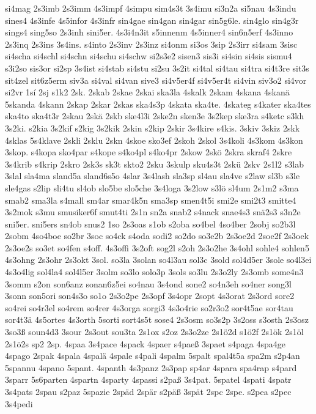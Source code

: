 {si4mag
2s3imb
2s3imm
4s3impf
4simpu
sim4s3t
3s4imu
si3n2a
si5nau
4s3indu
sines4
4s3infe
4s5infor
4s3infr
sin4gae
sin4gan
sin4gar
sin5g6le.
sin4glo
sin4g3r
sings4
sing5so
2s3inh
sini5er.
4s3i4n3it
s5innenm
4s5inner4
sin6n5erf
4s3inno
2s3inq
2s3ins
3s4ins.
s4into
2s3inv
2s3inz
si4onm
si3os
3sip
2s3irr
si4sam
3sisc
si4scha
si4schl
si4schn
si4schu
si4schw
si2s3e2
sisen3
sis3i
si4sin
si4sis
sismu4
s3i2so
sis3or
si2sp
3s4ist
si4stab
si4stu
si2su
3s2it
si4tal
si4tau
si4tra
si4t3re
sit3s
sit4zel
sit6z5erm
siv3a
si4val
si4van
sive3
si4v5er4f
si4v5er4t
si4vin
siv3o2
si4vor
si2vr
1sí
2sj
s1k2
2sk.
2skab
2skae
2skai
ska3la
4skalk
2skam
4skana
4skanä
5skanda
4skann
2skap
2skar
2skas
ska4s3p
4skata
ska4te.
4skateg
s4kater
ska4tes
ska4to
ska4t3r
2skau
2skä
2skb
ske4l3i
2ske2n
sken3e
3s2kep
ske3ra
s4ketc
s3kh
3s2ki.
s2kia
3s2kif
s2kig
3s2kik
2skin
s2kip
2skir
3s4kire
s4kis.
3skiv
3skiz
2skk
4sklas
5s4klave
2skli
2sklu
2skn
4skoe
sko3ef
2skoh
2skol
3s4koli
4s3kom
4s3kon
3skop.
s4kopa
sko4par
s4kope
s4ko4pl
s4ko4pr
2skow
2skö
2skra
skraf4
2skre
3s4krib
s4krip
2skro
2sk3s
sk3t
skto2
2sku
3skulp
sku4s3t
2skü
2skv
2s1l2
s3lab
3slal
sla4ma
sland5a
sland6s5o
4slar
3s4lash
sla3sp
sl4au
sla4ve
s2law
sl3b
s3le
sle4gas
s2lip
sli4tu
sl4ob
slo5be
slo5che
3s4loga
3s2low
s3lö
sl4um
2s1m2
s3ma
smab2
sma3la
s4mall
sm4ar
smar4k5n
sma3sp
smen4t5i
smi2e
smi2t3
smitte4
3s2mok
s3mu
smusiker6f
smut4ti
2s1n
sn2a
snab2
s4nack
snae4s3
snä2s3
s3n2e
sni5er.
sni5ers
sn4ob
snus2
1so
2s3oas
s1ob
s2oba
so4bel
4so4ber
2sobj
so2b3l
2sobm
4so4boe
so2br
3soc
so4ck
s4oda
sodi2
so2do
so3e2b
2s3oe2d
2soe2f
2s3oek
2s3oe2s
so3et
so4fen
s4off.
4s3offi
3s2oft
sog2l
s2oh
2s3o2he
3s4ohl
sohle4
sohlen5
4s3ohng
2s3ohr
2s3okt
3sol.
so3la
3solan
so4l3au
sol3c
3sold
sol4d5er
3sole
so4l3ei
4s3o4lig
sol4la4
sol4l5er
3solm
so3lo
solo3p
3sols
so3lu
2s3o2ly
2s3omb
some4n3
3somm
s2on
son6anz
sonan6z5ei
so4nau
3s4ond
sone2
so4n3eh
so4ner
song3l
3sonn
son5ori
son4s3o
so1o
2s3o2pe
2s3opf
3s4opr
2sopt
4s3orat
2s3ord
sore2
so4rei
so4r3el
so4rem
so4rer
4s3orga
sorgi3
4s3o4rie
so2r3o2
sor4t5ae
sor4tau
sor4t3ä
4s5ortes
4s3orth
5sorti
sort4s5t
sose4
2s3osm
so3s2p
3s2oss
s3osth
2s3osz
3so3ß
soun4d3
3sour
2s3out
sou3ta
2s1ox
s2oz
2s3o2ze
2s1ö2d
s1ö2f
2s1ök
2s1öl
2s1ö2s
sp2
2sp.
4spaa
3s4pace
4spack
4spaer
s4paeß
3spaet
s4paga
4spa4ge
4spago
2spak
4spala
4spalä
4spale
s4pali
4spalm
5spalt
spal4t5a
spa2m
s2p4an
5spannu
4spano
5spant.
4spanth
4s3panz
2s3pap
sp4ar
4spara
spa4rap
s4pard
3sparr
5s6parten
4spartn
4sparty
4spassi
s2paß
3s4pat.
5spatel
4spati
4spatr
3s4pats
2spau
s2paz
5spazie
2späd
2spär
s2päß
3spät
2spc
2spe.
s2pea
s2pec
3s4pedi
}
